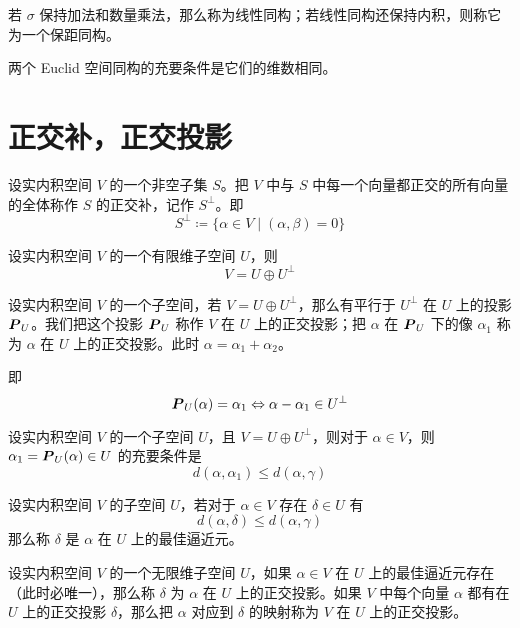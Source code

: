 若 $\sigma$ 保持加法和数量乘法，那么称为线性同构；若线性同构还保持内积，则称它为一个保距同构。

\begin{theorem}
	两个 Euclid 空间同构的充要条件是它们的维数相同。
\end{theorem}

\section{正交补，正交投影}

\begin{definition}
	设实内积空间 $V$ 的一个非空子集 $S$。把 $V$ 中与 $S$ 中每一个向量都正交的所有向量的全体称作 $S$ 的正交补，记作 $S^\bot$。即
	\[ S^\bot \coloneqq \{ \alpha \in V \mid (\alpha,\beta) = 0 \} \]
\end{definition}

\begin{theorem}
	设实内积空间 $V$ 的一个有限维子空间 $U$，则
	\[ V = U \oplus U^\bot \]
\end{theorem}

设实内积空间 $V$ 的一个子空间，若 $V = U \oplus U^\bot$，那么有平行于 $U^\bot$ 在 $U$ 上的投影 $\boldsymbol{P}_U$。我们把这个投影 $\boldsymbol{P}_U$ 称作 $V$ 在 $U$ 上的正交投影；把  $\alpha$ 在 $\boldsymbol{P}_U$ 下的像 $\alpha_1$ 称为 $\alpha$ 在 $U$ 上的正交投影。此时 $\alpha = \alpha_1 + \alpha_2$。

即
\[ \boldsymbol{P}_U(\alpha) = \alpha_1 \Leftrightarrow \alpha - \alpha_1 \in U^\bot \]

\begin{theorem}
	设实内积空间 $V$ 的一个子空间 $U$，且 $V = U \oplus U^\bot$，则对于 $\alpha \in V$，则 $\alpha_1 = \boldsymbol{P}_U(\alpha) \in U$ 的充要条件是
	\[ d(\alpha,\alpha_1) \leqslant d(\alpha,\gamma) \]
\end{theorem}

\begin{definition}
	设实内积空间 $V$ 的子空间 $U$，若对于 $\alpha \in V$ 存在 $\delta \in U$ 有
	\[ d(\alpha,\delta) \leqslant d(\alpha,\gamma) \]
	那么称 $\delta$ 是 $\alpha$ 在 $U$ 上的最佳逼近元。
\end{definition}

设实内积空间 $V$ 的一个无限维子空间 $U$，如果 $\alpha \in V$ 在 $U$ 上的最佳逼近元存在（此时必唯一），那么称 $\delta$ 为 $\alpha$ 在 $U$ 上的正交投影。如果 $V$ 中每个向量 $\alpha$ 都有在 $U$ 上的正交投影 $\delta$，那么把 $\alpha$ 对应到 $\delta$ 的映射称为 $V$ 在 $U$ 上的正交投影。

